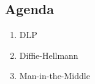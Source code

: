 

\subsection{Agenda}
\begin{enumerate}
\item DLP
\item Diffie-Hellmann
\item Man-in-the-Middle
\end{enumerate}
